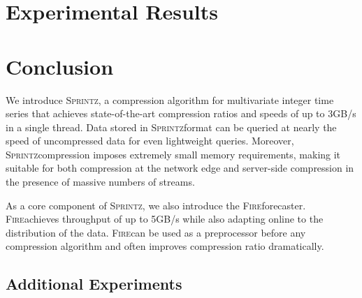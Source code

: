 \documentclass{vldb}
\newcommand{\minesp}{\textsc{Sprintz}\text{ }}
\newcommand{\fire}{\textsc{Fire}\text{ }}
\begin{document}


\section{Experimental Results} \label{sec:results}



\section{Conclusion} \label{sec:conclusion}

We introduce \minesp, a compression algorithm for multivariate integer time series that achieves state-of-the-art compression ratios and speeds of up to 3GB/s in a single thread. Data stored in \minesp format can be queried at nearly the speed of uncompressed data for even lightweight queries. Moreover, \minesp compression imposes extremely small memory requirements, making it suitable for both compression at the network edge and server-side compression in the presence of massive numbers of streams.

As a core component of \minesp, we also introduce the \fire forecaster. \fire achieves throughput of up to 5GB/s while also adapting online to the distribution of the data. \fire can be used as a preprocessor before any compression algorithm and often improves compression ratio dramatically.


\begin{appendix}
\section{Additional Experiments} \label{sec:moreResults}



\end{appendix}
\vspace{-1mm}


% 


\end{document}

